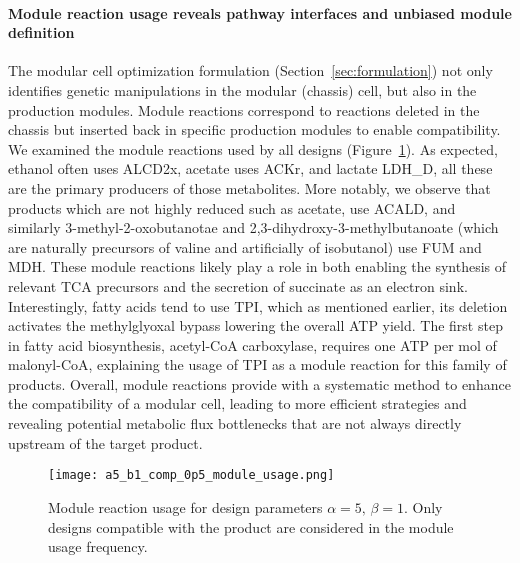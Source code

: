 {\paragraph{Module reaction usage reveals pathway interfaces and unbiased module definition}
The modular cell optimization formulation (Section~\ref{sec:formulation}) not only identifies genetic manipulations in the modular (chassis) cell, but also in the production modules.
Module reactions correspond to reactions deleted in the chassis but inserted back in specific production modules to enable compatibility.
We examined the module reactions used by all designs (Figure~\ref{fig7:module-usage}).
As expected, ethanol often uses ALCD2x, acetate uses ACKr, and lactate LDH\_D, all these are the primary producers of those metabolites.
More notably, we observe that products which are not highly reduced such as acetate, use ACALD, and similarly 3-methyl-2-oxobutanotae and 2,3-dihydroxy-3-methylbutanoate (which are naturally precursors of valine and artificially of isobutanol\citep{atsumi2008,atsumi2010}) use FUM and MDH.
These module reactions likely play a role in both enabling the synthesis of relevant TCA precursors and the secretion of succinate as an electron sink.
Interestingly, fatty acids tend to use TPI, which as mentioned earlier, its deletion activates the methylglyoxal bypass lowering the overall ATP yield.
The first step in fatty acid biosynthesis, acetyl-CoA carboxylase, requires one ATP per mol of malonyl-CoA, explaining the usage of TPI as a module reaction for this family of products.
Overall, module reactions provide with a systematic method to enhance the compatibility of a modular cell, leading to more efficient strategies and revealing potential metabolic flux bottlenecks that are not always directly upstream of the target product.

\begin{figure}[h]
    \centering
    \texttt{[image: a5\_b1\_comp\_0p5\_module\_usage.png]}
    \caption[Module reaction usage]{Module reaction usage for design parameters $\alpha=5, \,\beta=1$. Only designs compatible with the product are considered in the module usage frequency.}%
    \label{fig7:module-usage}
\end{figure}

}
